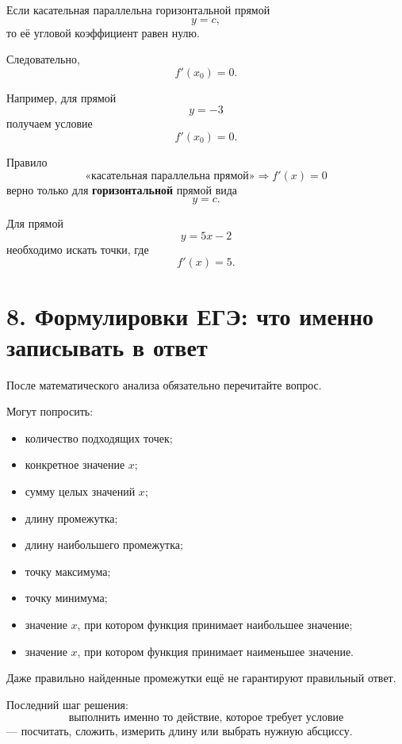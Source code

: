 \documentclass[a4paper,12pt]{article}
\begin{document}
\begin{keybox}
Если касательная параллельна горизонтальной прямой
\[
y=c,
\]
то её угловой коэффициент равен нулю.

Следовательно,
\[
f'(x_0)=0.
\]

Например, для прямой
\[
y=-3
\]
получаем условие
\[
f'(x_0)=0.
\]
\end{keybox}

\begin{errorbox}
Правило
\[
\text{«касательная параллельна прямой»}
\Rightarrow f'(x)=0
\]
верно только для \textbf{горизонтальной} прямой вида
\[
y=c.
\]

Для прямой
\[
y=5x-2
\]
необходимо искать точки, где
\[
f'(x)=5.
\]
\end{errorbox}

\section*{8. Формулировки ЕГЭ: что именно записывать в ответ}

После математического анализа обязательно перечитайте вопрос.

Могут попросить:

\begin{itemize}[leftmargin=7mm]
  \item количество подходящих точек;
  \item конкретное значение \(x\);
  \item сумму целых значений \(x\);
  \item длину промежутка;
  \item длину наибольшего промежутка;
  \item точку максимума;
  \item точку минимума;
  \item значение \(x\), при котором функция принимает наибольшее значение;
  \item значение \(x\), при котором функция принимает наименьшее значение.
\end{itemize}

\begin{keybox}
Даже правильно найденные промежутки ещё не гарантируют правильный ответ.

Последний шаг решения:
\[
\boxed{\text{выполнить именно то действие, которое требует условие}}
\]
--- посчитать, сложить, измерить длину или выбрать нужную абсциссу.
\end{keybox}
\end{document}
